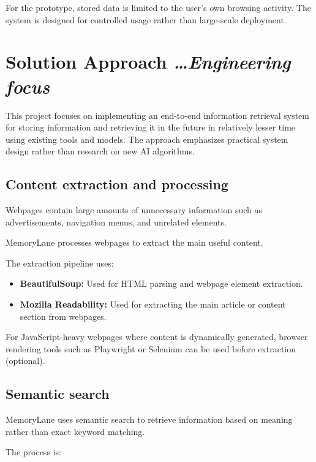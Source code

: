 \documentclass[11pt,a4paper]{article}
\newcommand{\BvrHint}[1]{%
  {\normalfont\normalsize\itshape\hfill #1}}
\begin{document}
For the prototype, stored data is limited to the user's own browsing activity. The system is designed for controlled usage rather than large-scale deployment.


\section{Solution Approach %
\BvrHint{\ldots Engineering focus}}

This project focuses on implementing an end-to-end information retrieval system for storing information and retrieving it in the future in relatively lesser time using existing tools and models. The approach emphasizes practical system design rather than research on new AI algorithms.


\subsection{Content extraction and processing}

Webpages contain large amounts of unnecessary information such as advertisements, navigation menus, and unrelated elements.

MemoryLane processes webpages to extract the main useful content.

The extraction pipeline uses:

\begin{itemize}[leftmargin=0.7cm]

\item \textbf{BeautifulSoup:} Used for HTML parsing and webpage element extraction.

\item \textbf{Mozilla Readability:} Used for extracting the main article or content section from webpages.

\end{itemize}

For JavaScript-heavy webpages where content is dynamically generated, browser rendering tools such as Playwright or Selenium can be used before extraction (optional).


\subsection{Semantic search}

MemoryLane uses semantic search to retrieve information based on meaning rather than exact keyword matching.

The process is:
\end{document}
